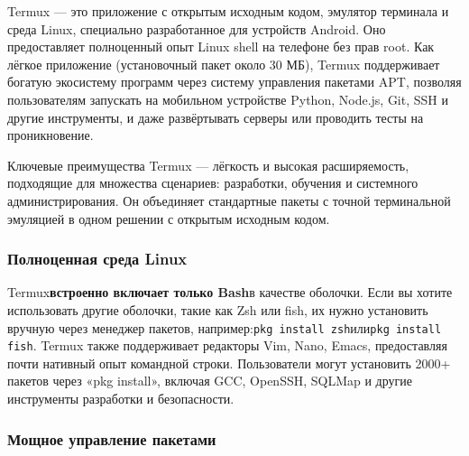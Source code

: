 


Termux — это приложение с открытым исходным кодом, эмулятор терминала и среда Linux, специально разработанное для устройств Android. Оно предоставляет полноценный опыт Linux shell на телефоне без прав root. Как лёгкое приложение (установочный пакет около 30 МБ), Termux поддерживает богатую экосистему программ через систему управления пакетами APT, позволяя пользователям запускать на мобильном устройстве Python, Node.js, Git, SSH и другие инструменты, и даже развёртывать серверы или проводить тесты на проникновение.

Ключевые преимущества Termux — лёгкость и высокая расширяемость, подходящие для множества сценариев: разработки, обучения и системного администрирования. Он объединяет стандартные пакеты с точной терминальной эмуляцией в одном решении с открытым исходным кодом.


\subsubsection*{Полноценная среда Linux}

Termux\textbf{встроенно включает только Bash}в качестве оболочки. Если вы хотите использовать другие оболочки, такие как Zsh или fish, их нужно установить вручную через менеджер пакетов, например:\texttt{pkg install zsh}или\texttt{pkg install fish}. Termux также поддерживает редакторы Vim, Nano, Emacs, предоставляя почти нативный опыт командной строки. Пользователи могут установить 2000+ пакетов через «pkg install», включая GCC, OpenSSH, SQLMap и другие инструменты разработки и безопасности.

\subsubsection*{Мощное управление пакетами}

